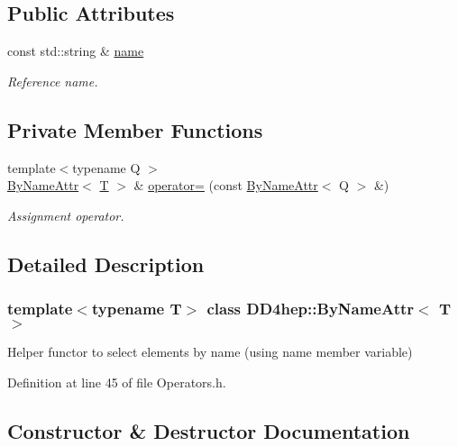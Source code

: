 \subsection*{Public Attributes}
\begin{DoxyCompactItemize}
\item 
const std\+::string \& \hyperlink{class_d_d4hep_1_1_by_name_attr_af7353d051e867c65d04fc7efb9975717}{name}
\begin{DoxyCompactList}\small\item\em Reference name. \end{DoxyCompactList}\end{DoxyCompactItemize}
\subsection*{Private Member Functions}
\begin{DoxyCompactItemize}
\item 
{\footnotesize template$<$typename Q $>$ }\\\hyperlink{class_d_d4hep_1_1_by_name_attr}{By\+Name\+Attr}$<$ \hyperlink{class_t}{T} $>$ \& \hyperlink{class_d_d4hep_1_1_by_name_attr_ade17ea4f15656cd891831acb2dc83465}{operator=} (const \hyperlink{class_d_d4hep_1_1_by_name_attr}{By\+Name\+Attr}$<$ Q $>$ \&)
\begin{DoxyCompactList}\small\item\em Assignment operator. \end{DoxyCompactList}\end{DoxyCompactItemize}


\subsection{Detailed Description}
\subsubsection*{template$<$typename T$>$\newline
class D\+D4hep\+::\+By\+Name\+Attr$<$ T $>$}

Helper functor to select elements by name (using name member variable) 

Definition at line 45 of file Operators.\+h.



\subsection{Constructor \& Destructor Documentation}
\hypertarget{class_d_d4hep_1_1_by_name_attr_a69abb8e2cf258848ca9b19ef02082fde}{}\label{class_d_d4hep_1_1_by_name_attr_a69abb8e2cf258848ca9b19ef02082fde} 
